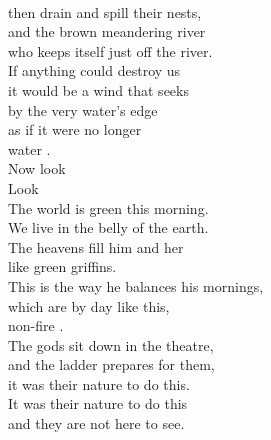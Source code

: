 \documentclass[smalldemyvopaper,11pt,twoside,onecolumn,openright,extrafontsizes]{memoir}
\begin{document}
\\then drain and spill their nests,
\\and the brown meandering river
\\who keeps itself just off the river.
\\If anything could destroy us
\\it would be a wind that seeks
\\by the very water's edge
\\as if it were no longer
\\water         .
\\Now look
\\Look
\\The world is green this morning.
\\We live in the belly of the earth.
\\The heavens fill him and her
\\like green griffins.
\\This is the way he balances his mornings,
\\which are by day like this,
\\non-fire         .
\\The gods sit down in the theatre,
\\and the ladder prepares for them,
\\it was their nature to do this.
\\It was their nature to do this
\\and they are not here to see.
\end{document}
